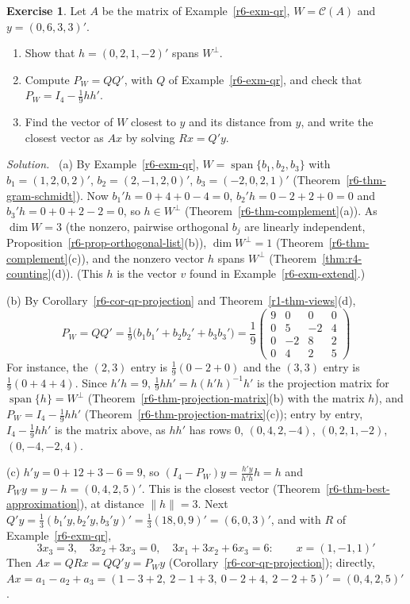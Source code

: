 \documentclass[12pt]{article}
\DeclareMathOperator{\Span}{span}
\theoremstyle{definition}
\newtheorem{exercise}{Exercise}
\newenvironment{solution}{\par\noindent\textit{Solution.}\ }{\par\smallskip}
\begin{document}
\begin{exercise}\label{r6-ex-qr-projection}
Let \(A\) be the matrix of Example~\ref{r6-exm-qr}, \(W=\mathcal C(A)\) and \(y=(0,6,3,3)'\).
\begin{enumerate}
\item Show that \(h=(0,2,1,-2)'\) spans \(W^\perp\).
\item Compute \(P_W=QQ'\), with \(Q\) of Example~\ref{r6-exm-qr}, and check that \(P_W=I_4-\frac19hh'\).
\item Find the vector of \(W\) closest to \(y\) and its distance from \(y\), and write the closest vector as \(Ax\) by
solving \(Rx=Q'y\).
\end{enumerate}
\end{exercise}
\begin{solution}
(a) By Example~\ref{r6-exm-qr}, \(W=\Span\{b_1,b_2,b_3\}\) with \(b_1=(1,2,0,2)'\), \(b_2=(2,-1,2,0)'\),
\(b_3=(-2,0,2,1)'\) (Theorem~\ref{r6-thm-gram-schmidt}). Now \(b_1'h=0+4+0-4=0\), \(b_2'h=0-2+2+0=0\) and
\(b_3'h=0+0+2-2=0\), so \(h\in W^\perp\) (Theorem~\ref{r6-thm-complement}(a)). As \(\dim W=3\) (the
nonzero, pairwise orthogonal \(b_j\) are linearly independent, Proposition~\ref{r6-prop-orthogonal-list}(b)),
\(\dim W^\perp=1\) (Theorem~\ref{r6-thm-complement}(c)), and the nonzero vector \(h\) spans \(W^\perp\)
(Theorem~\ref{thm:r4-counting}(d)). (This \(h\) is the vector \(v\) found in Example~\ref{r6-exm-extend}.)

(b) By Corollary~\ref{r6-cor-qr-projection} and Theorem~\ref{r1-thm-views}(d),
\[
P_W=QQ'=\tfrac19\bigl(b_1b_1'+b_2b_2'+b_3b_3'\bigr)=\frac19\begin{pmatrix}9&0&0&0\\0&5&-2&4\\0&-2&8&2\\0&4&2&5\end{pmatrix}
\]
For instance, the \((2,3)\) entry is \(\frac19(0-2+0)\) and the \((3,3)\) entry is \(\frac19(0+4+4)\). Since
\(h'h=9\), \(\frac19hh'=h(h'h)^{-1}h'\) is the projection matrix for \(\Span\{h\}=W^\perp\)
(Theorem~\ref{r6-thm-projection-matrix}(b) with the matrix \(h\)), and \(P_W=I_4-\frac19hh'\)
(Theorem~\ref{r6-thm-projection-matrix}(c)); entry by entry, \(I_4-\frac19hh'\) is the matrix
above, as \(hh'\) has rows \(0\), \((0,4,2,-4)\), \((0,2,1,-2)\), \((0,-4,-2,4)\).

(c) \(h'y=0+12+3-6=9\), so \((I_4-P_W)y=\frac{h'y}{h'h}h=h\) and \(P_Wy=y-h=(0,4,2,5)'\). This is the closest vector
(Theorem~\ref{r6-thm-best-approximation}), at distance \(\lVert h\rVert=3\). Next
\(Q'y=\frac13(b_1'y,b_2'y,b_3'y)'=\frac13(18,0,9)'=(6,0,3)'\), and with \(R\) of Example~\ref{r6-exm-qr},
\[
3x_3=3,\quad 3x_2+3x_3=0,\quad 3x_1+3x_2+6x_3=6:\qquad x=(1,-1,1)'
\]
Then \(Ax=QRx=QQ'y=P_Wy\) (Corollary~\ref{r6-cor-qr-projection}); directly,
\(Ax=a_1-a_2+a_3=(1-3+2,\ 2-1+3,\ 0-2+4,\ 2-2+5)'=(0,4,2,5)'\).
\end{solution}
\end{document}
